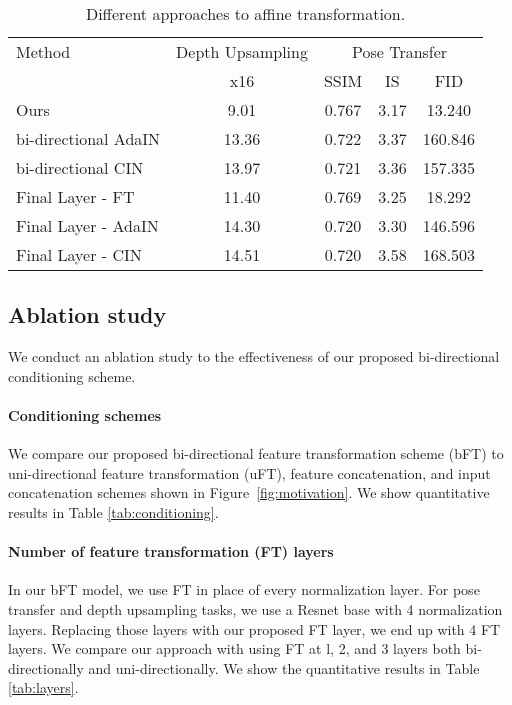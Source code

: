 \documentclass[10pt,twocolumn,letterpaper]{article}
\newlength\paramargin
\newlength\secmargin
\newlength\tabmargin
\newcommand{\figref}[1]{Figure~\ref{fig:#1}}
\begin{document}
\begin{table}[htbp]\setlength{\tabcolsep}{4pt}
	\centering\footnotesize
    \caption{Different approaches to affine transformation.}\label{tab:affine}
    \begin{tabular}{l|cccc}
		\toprule
		Method & Depth Upsampling  & \multicolumn{3}{c}{Pose Transfer} \\
         	                  & x16               &  SSIM & IS & FID \\
\midrule
        Ours                     & 9.01              & 0.767 & 3.17 &
         13.240 \\
        bi-directional AdaIN                 & 13.36             & 0.722 & 3.37 & 160.846 \\
        bi-directional CIN                   & 13.97             & 0.721 & 3.36 & 157.335 \\
        \midrule
        Final Layer - FT                      & 11.40              & 0.769 & 3.25 & 18.292 \\
        Final Layer - AdaIN                   & 14.30              & 0.720 & 3.30 & 146.596 \\
        Final Layer - CIN                     & 14.51              & 0.720 & 3.58 & 168.503 \\
        \bottomrule
	\end{tabular}
	\vspace{\tabmargin}
\end{table}


\vspace{\secmargin}
\subsection{Ablation study}
We conduct an ablation study to the effectiveness of our proposed bi-directional conditioning scheme. 


\vspace{\paramargin} \paragraph{Conditioning schemes}
We compare our proposed bi-directional feature transformation scheme (bFT) to uni-directional feature transformation (uFT), feature concatenation, and input concatenation schemes shown in \figref{motivation}. We show quantitative results in Table \ref{tab:conditioning}.

\vspace{\paramargin} \paragraph{Number of feature transformation (FT) layers}
In our bFT model, we use FT in place of every normalization layer. For pose transfer and depth upsampling tasks, we use a Resnet base with 4 normalization layers. Replacing those layers with our proposed FT layer, we end up with 4 FT layers. We compare our approach with using FT at l, 2, and 3 layers both bi-directionally and uni-directionally. We show the quantitative results in Table \ref{tab:layers}.
\end{document}
